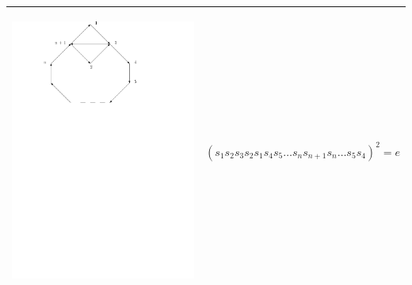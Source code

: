 \documentclass[11pt]{amsart}
\theoremstyle{definition}
\begin{document}
\begin{table}
\begin{tabular}{| p{3.5cm} | p{7cm} |}
\begin{center}\includegraphics[scale = .30]{Diagram2.pdf}\end{center} 
& $(s_{1}s_{2}s_{3}s_{2}s_{1}s_{4}s_{5} \dots s_{n}s_{n+1}s_{n} \dots s_{5}s_{4})^{2} = e$ \\ \hline


\end{tabular}
\end{table}
\end{document}
